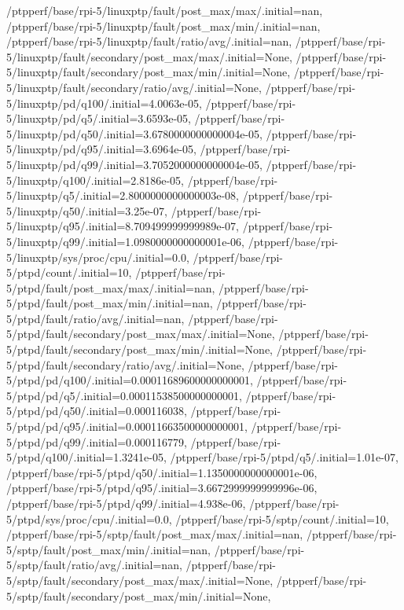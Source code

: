 {    /ptpperf/base/rpi-5/linuxptp/fault/post_max/max/.initial=nan,
    /ptpperf/base/rpi-5/linuxptp/fault/post_max/min/.initial=nan,
    /ptpperf/base/rpi-5/linuxptp/fault/ratio/avg/.initial=nan,
    /ptpperf/base/rpi-5/linuxptp/fault/secondary/post_max/max/.initial=None,
    /ptpperf/base/rpi-5/linuxptp/fault/secondary/post_max/min/.initial=None,
    /ptpperf/base/rpi-5/linuxptp/fault/secondary/ratio/avg/.initial=None,
    /ptpperf/base/rpi-5/linuxptp/pd/q100/.initial=4.0063e-05,
    /ptpperf/base/rpi-5/linuxptp/pd/q5/.initial=3.6593e-05,
    /ptpperf/base/rpi-5/linuxptp/pd/q50/.initial=3.6780000000000004e-05,
    /ptpperf/base/rpi-5/linuxptp/pd/q95/.initial=3.6964e-05,
    /ptpperf/base/rpi-5/linuxptp/pd/q99/.initial=3.7052000000000004e-05,
    /ptpperf/base/rpi-5/linuxptp/q100/.initial=2.8186e-05,
    /ptpperf/base/rpi-5/linuxptp/q5/.initial=2.8000000000000003e-08,
    /ptpperf/base/rpi-5/linuxptp/q50/.initial=3.25e-07,
    /ptpperf/base/rpi-5/linuxptp/q95/.initial=8.709499999999989e-07,
    /ptpperf/base/rpi-5/linuxptp/q99/.initial=1.0980000000000001e-06,
    /ptpperf/base/rpi-5/linuxptp/sys/proc/cpu/.initial=0.0,
    /ptpperf/base/rpi-5/ptpd/count/.initial=10,
    /ptpperf/base/rpi-5/ptpd/fault/post_max/max/.initial=nan,
    /ptpperf/base/rpi-5/ptpd/fault/post_max/min/.initial=nan,
    /ptpperf/base/rpi-5/ptpd/fault/ratio/avg/.initial=nan,
    /ptpperf/base/rpi-5/ptpd/fault/secondary/post_max/max/.initial=None,
    /ptpperf/base/rpi-5/ptpd/fault/secondary/post_max/min/.initial=None,
    /ptpperf/base/rpi-5/ptpd/fault/secondary/ratio/avg/.initial=None,
    /ptpperf/base/rpi-5/ptpd/pd/q100/.initial=0.00011689600000000001,
    /ptpperf/base/rpi-5/ptpd/pd/q5/.initial=0.00011538500000000001,
    /ptpperf/base/rpi-5/ptpd/pd/q50/.initial=0.000116038,
    /ptpperf/base/rpi-5/ptpd/pd/q95/.initial=0.00011663500000000001,
    /ptpperf/base/rpi-5/ptpd/pd/q99/.initial=0.000116779,
    /ptpperf/base/rpi-5/ptpd/q100/.initial=1.3241e-05,
    /ptpperf/base/rpi-5/ptpd/q5/.initial=1.01e-07,
    /ptpperf/base/rpi-5/ptpd/q50/.initial=1.1350000000000001e-06,
    /ptpperf/base/rpi-5/ptpd/q95/.initial=3.6672999999999996e-06,
    /ptpperf/base/rpi-5/ptpd/q99/.initial=4.938e-06,
    /ptpperf/base/rpi-5/ptpd/sys/proc/cpu/.initial=0.0,
    /ptpperf/base/rpi-5/sptp/count/.initial=10,
    /ptpperf/base/rpi-5/sptp/fault/post_max/max/.initial=nan,
    /ptpperf/base/rpi-5/sptp/fault/post_max/min/.initial=nan,
    /ptpperf/base/rpi-5/sptp/fault/ratio/avg/.initial=nan,
    /ptpperf/base/rpi-5/sptp/fault/secondary/post_max/max/.initial=None,
    /ptpperf/base/rpi-5/sptp/fault/secondary/post_max/min/.initial=None,
}
